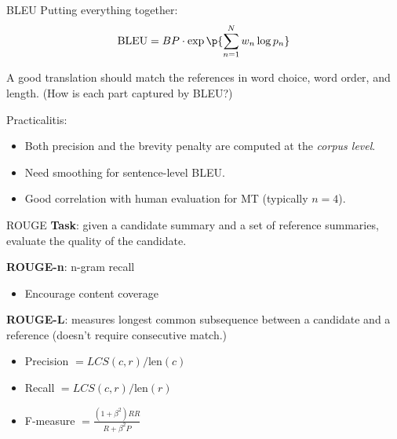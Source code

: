 \documentclass[usenames,dvipsnames,notes,11pt,aspectratio=169,hyperref={colorlinks=true, linkcolor=blue}]{beamer}
\begin{document}
\begin{frame}
    {BLEU}
    Putting everything together:
    \begin{align*}
        \text{BLEU} &= BP\cdot \exp\p{\sum_{n=1}^N w_n \log p_n} \\
    \end{align*}
    \vspace{-2em}

    \pause
    A good translation should match the references in word choice, word order, and length. (How is each part captured by BLEU?)

    \pause
    Practicalitis:\\
    \begin{itemize}
        \item Both precision and the brevity penalty are computed at the \emph{corpus level}.
        \item Need smoothing for sentence-level BLEU.
        \item Good correlation with human evaluation for MT (typically $n=4$).
    \end{itemize}
\end{frame}

\begin{frame}
    {ROUGE}
    \textbf{Task}: given a candidate summary and a set of reference summaries, evaluate the quality of the candidate.

    \textbf{ROUGE-n}: n-gram recall\\
    \begin{itemize}
        \item Encourage content coverage 
    \end{itemize}

    \textbf{ROUGE-L}: measures longest common subsequence between a candidate and a reference (doesn't require consecutive match.)\\
    \begin{itemize}
        \item Precision $ = LCS(c, r) / \text{len}(c)$
        \item Recall $ = LCS(c, r) / \text{len}(r)$
        \item F-measure $ = \frac{(1+\beta^2)RR}{R + \beta^2 P}$
    \end{itemize}
\end{frame}
\end{document}
